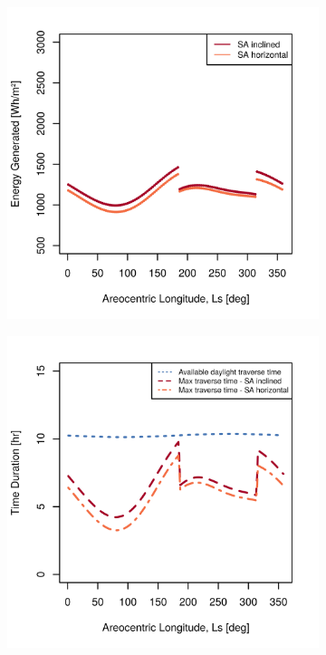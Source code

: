 \documentclass[twocolumn,letterpaper]{IEEEAerospaceCLS}  %
\newlength{\subfigureWidth}
\newlength{\graphicsHeight}
\begin{document}
\begin{figure}[h]
\captionsetup[subfigure]{justification=centering}
  \centering
  \setlength{\subfigureWidth}{0.24\textwidth}
  \setlength{\graphicsHeight}{40mm}
  \begin{subfigure}[t]{\subfigureWidth}
    \centering
    \includegraphics[height=\graphicsHeight]{figures/plots/ianichaos-daily-generated-energy-for-solar-cell-coverage-area-23m2.png}
    \label{fig:plot:sub:iani-chaos-generated-energy}
  \end{subfigure}\hfill
  \begin{subfigure}[t]{\subfigureWidth}
    \centering
    \includegraphics[height=\graphicsHeight]{figures/plots/ianichaos-75w-max-traverse-durations-for-solar-cell-coverage-area-23m2.png}

\end{subfigure}
\end{figure}
\end{document}

